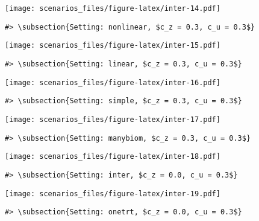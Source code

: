 \documentclass[
]{article}
\begin{document}
\texttt{[image: scenarios\_files/figure-latex/inter-14.pdf]}

\begin{verbatim}
#> \subsection{Setting: nonlinear, $c_z = 0.3, c_u = 0.3$}
\end{verbatim}

\texttt{[image: scenarios\_files/figure-latex/inter-15.pdf]}

\begin{verbatim}
#> \subsection{Setting: linear, $c_z = 0.3, c_u = 0.3$}
\end{verbatim}

\texttt{[image: scenarios\_files/figure-latex/inter-16.pdf]}

\begin{verbatim}
#> \subsection{Setting: simple, $c_z = 0.3, c_u = 0.3$}
\end{verbatim}

\texttt{[image: scenarios\_files/figure-latex/inter-17.pdf]}

\begin{verbatim}
#> \subsection{Setting: manybiom, $c_z = 0.3, c_u = 0.3$}
\end{verbatim}

\texttt{[image: scenarios\_files/figure-latex/inter-18.pdf]}

\begin{verbatim}
#> \subsection{Setting: inter, $c_z = 0.0, c_u = 0.3$}
\end{verbatim}

\texttt{[image: scenarios\_files/figure-latex/inter-19.pdf]}

\begin{verbatim}
#> \subsection{Setting: onetrt, $c_z = 0.0, c_u = 0.3$}
\end{verbatim}
\end{document}
